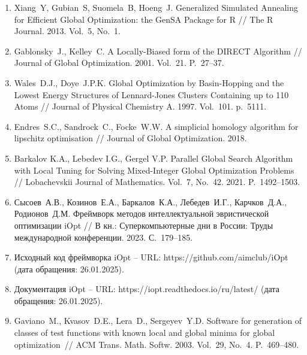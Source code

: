 \documentclass[a4paper,12pt,russian]{article}
\begin{document}
\begin{enumerate}
\item \label{rfa:rulit:dual_annealing}
Xiang~Y, Gubian~S, Suomela~B, Hoeng~J. Generalized Simulated Annealing for Efficient Global Optimization: the GenSA Package for R // The R Journal. 2013. Vol.~5, No.~1.

\item \label{rfa:rulit:direct}
Gablonsky~J., Kelley~C. A Locally-Biased form of the DIRECT Algorithm // Journal of Global Optimization. 2001. Vol.~21. P.~27--37.

\item \label{rfa:rulit:basinhopping}
Wales~D.J., Doye~J.P.K. Global Optimization by Basin-Hopping and the Lowest Energy Structures of Lennard-Jones Clusters Containing up to 110 Atoms // Journal of Physical Chemistry A. 1997. Vol.~101. p.~5111.

\item \label{rfa:rulit:shgo}
Endres~S.C., Sandrock~C., Focke~W.W. A simplicial homology algorithm for lipschitz optimisation // Journal of Global Optimization. 2018.

\item \label{rfa:rulit:Barkalov2021}
Barkalov K.A., Lebedev I.G., Gergel V.P. Parallel Global Search Algorithm with Local Tuning for Solving Mixed-Integer Global Optimization Problems // Lobachevskii Journal of Mathematics. Vol.~7, No.~42. 2021. P.~1492--1503.

\item \label{rfa:rulit:iOptPaper}
Сысоев~А.В., Козинов~Е.А., Баркалов~К.А., Лебедев~И.Г., Карчков~Д.А., Родионов~Д.М. Фреймворк методов интеллектуальной эвристической оптимизации iOpt // В кн.: Суперкомпьютерные дни в России: Труды международной конференции. 2023. С.~179--185.

\item \label{rfa:rulit:iOptGithub}
Исходный код фреймворка iOpt -- URL: https://github.com/aimclub/iOpt (дата обращения: 26.01.2025).

\item \label{rfa:rulit:iOptDocs}
Документация iOpt -- URL: https://iopt.readthedocs.io/ru/latest/ (дата обращения: 26.01.2025).

\item \label{rfa:rulit:Gaviano2003}
Gaviano~M., Kvasov~D.E., Lera~D., Sergeyev~Y.D. Software for generation of classes of test functions with known local and global minima for global optimization~// ACM Trans. Math. Softw. 2003. Vol.~29, No.~4. P.~469--480.

\end{enumerate}
\end{document}
